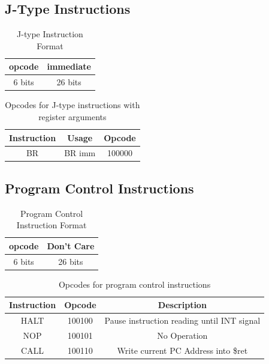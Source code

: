 \documentclass{article}
\begin{document}
\subsection{J-Type Instructions}

\begin{table}[H]
    \centering
    \begin{tabular}{|c|c|}
        \hline
        \textbf{opcode} & \textbf{immediate} \\
        \hline
        6 bits & 26 bits \\
        \hline
    \end{tabular}
    \caption{J-type Instruction Format}
\end{table}

\begin{table}[H]
    \centering
    \begin{tabular}{|c|c|c|}
        \hline
        \textbf{Instruction} & \textbf{Usage} & \textbf{Opcode} \\
        \hline
        BR & BR imm & 100000 \\
        \hline
    \end{tabular}
    \caption{Opcodes for J-type instructions with register arguments}
\end{table}

\subsection{Program Control Instructions}
\begin{table}[H]
    \centering
    \begin{tabular}{|c|c|}
        \hline
        \textbf{opcode} & \textbf{Don't Care} \\
        \hline
        6 bits & 26 bits \\
        \hline
    \end{tabular}
    \caption{Program Control Instruction Format}
\end{table}

\begin{table}[H]
    \centering
    \begin{tabular}{|c|c|c|}
        \hline
        \textbf{Instruction} & \textbf{Opcode} & \textbf{Description} \\
        \hline
        HALT  & 100100 & Pause instruction reading until INT signal\\
        NOP  & 100101 & No Operation\\
        CALL & 100110 & Write current PC Address into \$ret\\
        \hline
    \end{tabular}
    \caption{Opcodes for program control instructions}
\end{table}
\end{document}
